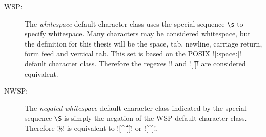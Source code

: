 \begin{description}
\item[WSP:] The \emph{whitespace} default character class uses the special sequence \verb!\s! to specify whitespace.  Many characters may be considered whitespace, but the definition for this thesis will be the space, tab, newline, carriage return, form feed and vertical tab.  This set is based on the POSIX \cverb![:space:]! default character class.  Therefore the regexes \cverb!\s! and \cverb![ \t\n\r\f\v]! are considered equivalent.
\item[NWSP:] The \emph{negated whitespace} default character class indicated by the special sequence \verb!\S! is simply the negation of the WSP default character class. Therefore \cverb!\S! is equivalent to \cverb![^ \t\n\r\f\v]]! or \cverb![^\s]!.
\end{description}

